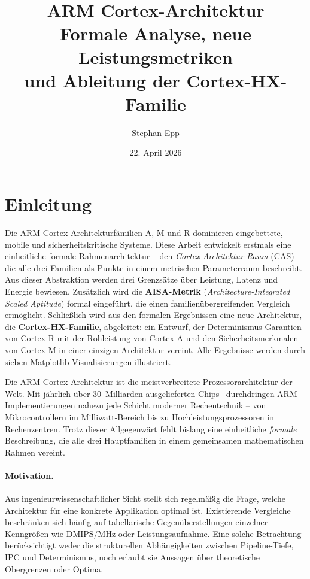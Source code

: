 ﻿\documentclass[a4paper,12pt]{article}
\title{{\bfseries ARM Cortex-Architektur}\\[-0.1em]
  Formale Analyse, neue Leistungsmetriken\\[-0.1em]
  und Ableitung der Cortex-HX-Familie}
\author{Stephan Epp}
\date{22. April 2026}
\theoremstyle{plain}
\theoremstyle{definition}
\theoremstyle{remark}
\begin{document}
\maketitle
\tableofcontents
\newpage

\section{Einleitung}\label{sec:intro}
Die ARM-Cortex-Architekturf\"amilien A, M und R dominieren eingebettete, mobile
und sicherheitskritische Systeme. Diese Arbeit entwickelt erstmals eine einheitliche
formale Rahmenarchitektur -- den \emph{Cortex-Architektur-Raum} (CAS) -- die alle
drei Familien als Punkte in einem metrischen Parameterraum beschreibt. Aus dieser
Abstraktion werden drei Grenzs\"atze \"uber Leistung, Latenz und Energie bewiesen.
Zus\"atzlich wird die \textbf{AISA-Metrik} (\emph{Architecture-Integrated Scaled
Aptitude}) formal eingef\"uhrt, die einen familien\"ubergreifenden Vergleich
erm\"oglicht. Schlie\ss{}lich wird aus den formalen Ergebnissen eine neue
Architektur, die \textbf{Cortex-HX-Familie}, abgeleitet: ein Entwurf, der
Determinismus-Garantien von Cortex-R mit der Rohleistung von Cortex-A und den
Sicherheitsmerkmalen von Cortex-M in einer einzigen Architektur vereint.
Alle Ergebnisse werden durch sieben Matplotlib-Visualisierungen illustriert.

Die ARM-Cortex-Architektur ist die meistverbreitete Prozessorarchitektur der Welt.
Mit j\"ahrlich \"uber 30~Milliarden ausgelieferten Chips~\cite{arm2023} durchdringen
ARM-Implementierun\-gen nahezu jede Schicht moderner Rechentechnik -- von
Mikrocontrollern im Milliwatt-Bereich bis zu Hochleistungsprozessoren in Rechenzentren.
Trotz dieser Allgegenw\"art fehlt bislang eine einheitliche \emph{formale} Beschreibung,
die alle drei Hauptfamilien in einem gemeinsamen mathematischen Rahmen vereint.

\paragraph{Motivation.}
Aus ingenieurwissenschaftlicher Sicht stellt sich regelm\"a\ss{}ig die Frage,
welche Architektur f\"ur eine konkrete Applikation optimal ist.
Existierende Vergleiche beschr\"anken sich h\"aufig auf tabellarische
Gegen\"uberstellungen einzelner Kenngr\"o\ss{}en wie DMIPS/MHz oder Leistungsaufnahme.
Eine solche Betrachtung ber\"ucksichtigt weder die strukturellen Abh\"angigkeiten
zwischen Pipeline-Tiefe, IPC und Determinismus, noch erlaubt sie Aussagen \"uber
theoretische Obergrenzen oder Optima.
\end{document}
